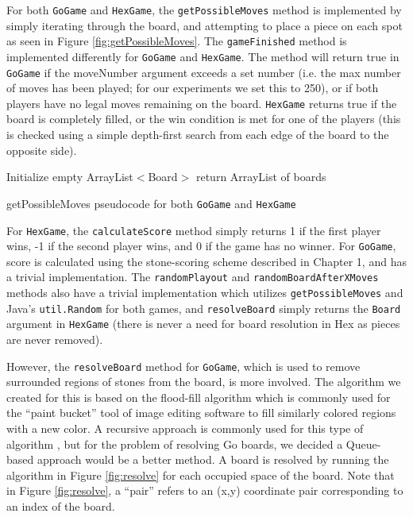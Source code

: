 For both \texttt{GoGame} and \texttt{HexGame}, the \texttt{getPossibleMoves} method is implemented by simply iterating through the board, and attempting to place a piece on each spot as seen in Figure \ref{fig:getPossibleMoves}.  The \texttt{gameFinished} method is implemented differently for \texttt{GoGame} and \texttt{HexGame}.  The method will return true in \texttt{GoGame} if the moveNumber argument exceeds a set number (i.e. the max number of moves has been played; for our experiments we set this to 250), or if both players have no legal moves remaining on the board.  \texttt{HexGame} returns true if the board is completely filled, or the win condition is met for one of the players (this is checked using a simple depth-first search from each edge of the board to the opposite side).

\begin{algorithm}[htbp]
 \SetAlgoLined %
 
 Initialize empty ArrayList$<$Board$>$\;
 return ArrayList of boards\;
 \caption{getPossibleMoves pseudocode for both \texttt{GoGame} and \texttt{HexGame}}
\label{fig:getPossibleMoves}
\end{algorithm}

For \texttt{HexGame}, the \texttt{calculateScore} method simply returns 1 if the first player wins, -1 if the second player wins, and 0 if the game has no winner.  For \texttt{GoGame}, score is calculated using the stone-scoring scheme described in Chapter 1, and has a trivial implementation.  The \texttt{randomPlayout} and \texttt{randomBoardAfterXMoves} methods also have a trivial implementation which utilizes \texttt{getPossibleMoves} and Java's \texttt{util.Random} for both games, and \texttt{resolveBoard} simply returns the \texttt{Board} argument in \texttt{HexGame} (there is never a need for board resolution in Hex as pieces are never removed).

However, the \texttt{resolveBoard} method for \texttt{GoGame}, which is used to remove surrounded regions of stones from the board, is more involved.  The algorithm we created for this is based on the flood-fill algorithm \cite{torbert} which is commonly used for the ``paint bucket'' tool of image editing software to fill similarly colored regions with a new color.  A recursive approach is commonly used for this type of algorithm \cite{torbert}, but for the problem of resolving Go boards, we decided a Queue-based approach would be a better method.  A board is resolved by running the algorithm in Figure \ref{fig:resolve} for each occupied space of the board.  Note that in Figure \ref{fig:resolve}, a ``pair'' refers to an (x,y) coordinate pair corresponding to an index of the board.

